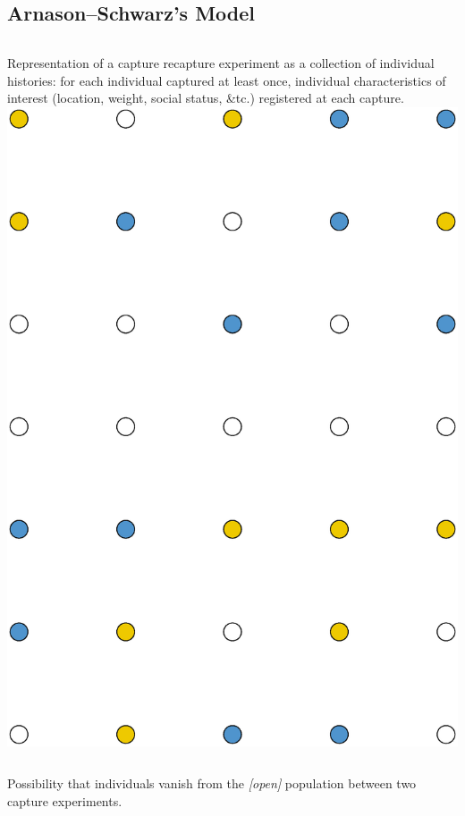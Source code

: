 \subsection{Arnason--Schwarz's Model}
\begin{slide}

\begin{columns}
Representation of a capture recapture experiment as a collection of individual histories:
for each individual captured at least once, individual characteristics
of interest (location, weight, social status, \&tc.) registered at each capture. 
\includegraphics[width=3truecm,angle=270]{figures/titlcap.eps}
\end{columns}

\vs\pause Possibility that individuals vanish from the {\em [open]} population 
between two capture experiments.


\end{slide}
